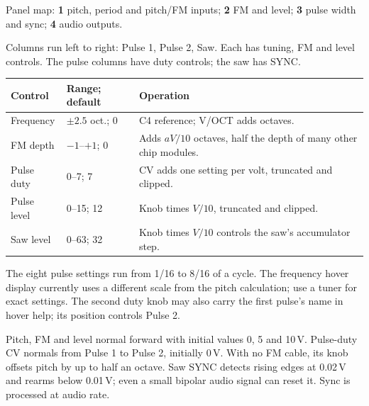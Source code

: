 Panel map: \textbf{1} pitch, period and pitch/FM inputs;
\textbf{2} FM and level;
\textbf{3} pulse width and sync;
\textbf{4} audio outputs.

Columns run left to right: Pulse 1, Pulse 2, Saw. Each has tuning, FM and
level controls. The pulse columns have duty controls; the saw has SYNC.

\begin{tabularx}{\textwidth}{@{}l l X@{}}
\toprule Control & Range; default & Operation \\\midrule
Frequency & $\pm2.5$ oct.; 0 & C4 reference; V/OCT adds octaves. \\
FM depth & $-1$--$+1$; 0 & Adds $aV/10$ octaves, half the depth of many other chip modules. \\
Pulse duty & 0--7; 7 & CV adds one setting per volt, truncated and clipped. \\
Pulse level & 0--15; 12 & Knob times $V/10$, truncated and clipped. \\
Saw level & 0--63; 32 & Knob times $V/10$ controls the saw's accumulator step. \\
\bottomrule
\end{tabularx}

The eight pulse settings run from 1/16 to 8/16 of a cycle. The frequency
hover display currently uses a different scale from the pitch calculation;
use a tuner for exact settings. The second duty knob may also carry the
first pulse's name in hover help; its position controls Pulse 2.

Pitch, FM and level normal forward with initial values 0, 5 and 10\,V.
Pulse-duty CV normals from Pulse 1 to Pulse 2, initially 0\,V. With no FM
cable, its knob offsets pitch by up to half an octave. Saw SYNC detects rising
edges at 0.02\,V and rearms below 0.01\,V; even a small bipolar audio signal
can reset it. Sync is processed at audio rate.
